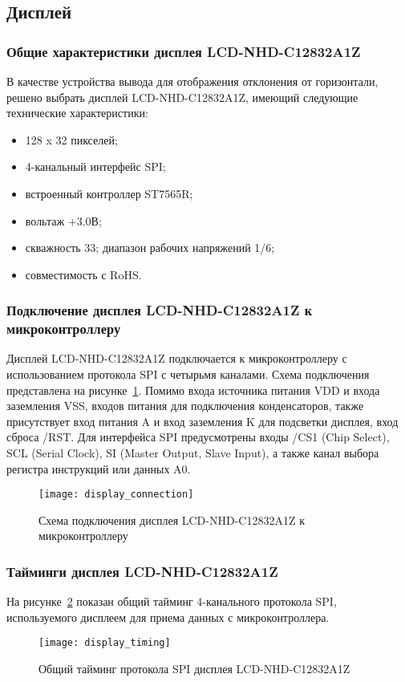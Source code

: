 \documentclass[document.tex]{subfiles}
\begin{document}
\clearpage
\subsection{Дисплей}
\subsubsection{Общие характеристики дисплея LCD-NHD-C12832A1Z}
В качестве устройства вывода для отображения отклонения от горизонтали, решено выбрать дисплей LCD-NHD-C12832A1Z, имеющий следующие технические характеристики:
\begin{itemize}
	\item 128 x 32 пикселей;
	\item 4-канальный интерфейс SPI;
	\item встроенный контроллер ST7565R;
	\item вольтаж +3.0В;
	\item скважность 33; диапазон рабочих напряжений 1/6;
	\item совместимость с RoHS.\cite{display}
\end{itemize}
\subsubsection{Подключение дисплея LCD-NHD-C12832A1Z к микроконтроллеру}
Дисплей LCD-NHD-C12832A1Z подключается к микроконтроллеру с использованием про\-токола SPI с четырьмя каналами. Схема подключения представлена на
рисунке~\ref{fig:display_connection}. Помимо входа источника питания VDD и входа заземления VSS, входов питания для подключения конденсаторов, также присутствует вход питания A и
вход заземления K для подсветки дисплея, вход сброса /RST. Для интерфейса SPI предусмотрены входы /CS1 (Chip Select), SCL (Serial Clock), SI (Master Output, Slave Input), а также
канал выбора регистра инструкций или данных A0.\cite{display, lcd_interfaces}

\begin{figure}[h]
\centering
\texttt{[image: display\_connection]}
\caption{Схема подключения дисплея LCD-NHD-C12832A1Z к микроконтроллеру}
\label{fig:display_connection}
\end{figure}

\clearpage
\subsubsection{Тайминги дисплея LCD-NHD-C12832A1Z}
На рисунке~\ref{fig:display_timing} показан общий тайминг 4-канального протокола SPI, используемого дисплеем для приема данных с микроконтроллера.
\begin{figure}[h]
\centering
\texttt{[image: display\_timing]}
\caption{Общий тайминг протокола SPI дисплея LCD-NHD-C12832A1Z}
\label{fig:display_timing}
\end{figure}
\end{document}
